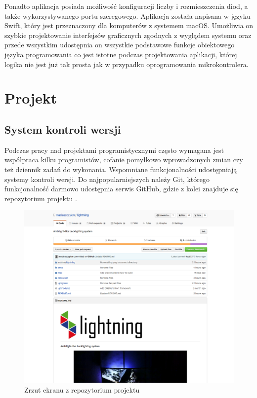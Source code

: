 \documentclass[12pt]{report}
\begin{document}
Ponadto aplikacja posiada możliwość konfiguracji liczby i rozmieszczenia diod, a także wykorzystywanego portu szeregowego.
Aplikacja została napisana w języku Swift, który jest przeznaczony dla komputerów z systemem macOS. Umożliwia on szybkie projektowanie interfejsów graficznych zgodnych z wyglądem systemu oraz przede wszystkim udostępnia on wszystkie podstawowe funkcje obiektowego języka programowania co jest istotne podczas projektowania aplikacji, której logika nie jest już tak prosta jak w przypadku oprogramowania mikrokontrolera.

\section{Projekt}

\subsection{System kontroli wersji}

Podczas pracy nad projektami programistycznymi często wymagana jest współpraca kilku programistów, cofanie pomyłkowo wprowadzonych zmian czy też dziennik zadań do wykonania. Wspomniane funkcjonalności udostępniają systemy kontroli wersji. Do najpopularniejszych należy Git, którego funkcjonalność darmowo udostępnia serwis   GitHub, gdzie z kolei znajduje się repozytorium projektu \cite{github}.

\begin{figure}[h]
\centering
\includegraphics[width=\textwidth]{../resources/github.png}
\caption{Zrzut ekranu z repozytorium projektu}
\label{schemat}
\end{figure}
\end{document}
